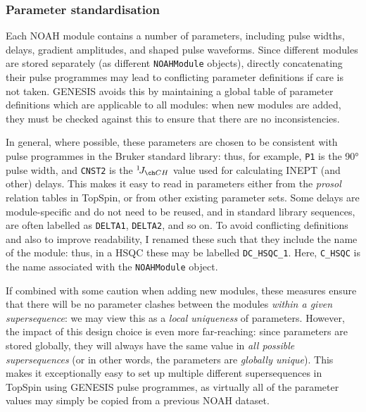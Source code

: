 \subsubsection{Parameter standardisation}

Each NOAH module contains a number of parameters, including pulse widths, delays, gradient amplitudes, and shaped pulse waveforms.
Since different modules are stored separately (as different \texttt{NOAHModule} objects), directly concatenating their pulse programmes may lead to conflicting parameter definitions if care is not taken.
GENESIS avoids this by maintaining a global table of parameter definitions which are applicable to all modules: when new modules are added, they must be checked against this to ensure that there are no inconsistencies.

In general, where possible, these parameters are chosen to be consistent with pulse programmes in the Bruker standard library: thus, for example, \texttt{P1} is the \proton{} \ang{90} pulse width, and \texttt{CNST2} is the $\oneJ{CH}$ value used for calculating INEPT (and other) delays.
This makes it easy to read in parameters either from the \textit{prosol} relation tables in TopSpin, or from other existing parameter sets.
Some delays are module-specific and do not need to be reused, and in standard library sequences, are often labelled as \texttt{DELTA1}, \texttt{DELTA2}, and so on.
To avoid conflicting definitions and also to improve readability, I renamed these such that they include the name of the module: thus, in a \carbon{} HSQC these may be labelled \texttt{DC\_HSQC\_1}.
Here, \texttt{C\_HSQC} is the name associated with the \texttt{NOAHModule} object.

If combined with some caution when adding new modules, these measures ensure that there will be no parameter clashes between the modules \textit{within a given supersequence}: we may view this as a \textit{local uniqueness} of parameters.
However, the impact of this design choice is even more far-reaching:
since parameters are stored globally, they will always have the same value in \textit{all possible supersequences} (or in other words, the parameters are \textit{globally unique}).
This makes it exceptionally easy to set up multiple different supersequences in TopSpin using GENESIS pulse programmes, as virtually all of the parameter values may simply be copied from a previous NOAH dataset.

